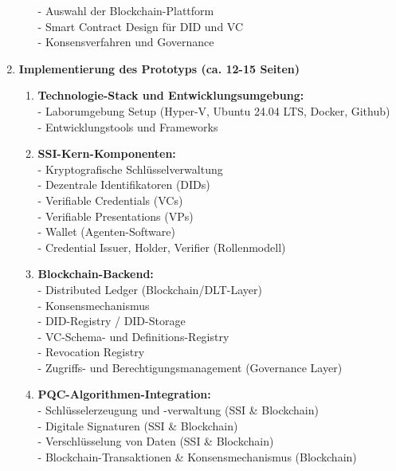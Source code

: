 \begin{enumerate}[label=\textbf{\arabic*.}]
\begin{enumerate}[label=\textbf{3.\arabic*}]
        - Auswahl der Blockchain-Plattform \\
        - Smart Contract Design für \ac{DID} und \ac{VC} \\
        - Konsensverfahren und Governance
    \end{enumerate}
    \item \textbf{Implementierung des Prototyps (ca. 12-15 Seiten)}
    \begin{enumerate}[label=\textbf{4.\arabic*}]
        \item \textbf{Technologie-Stack und Entwicklungsumgebung:} \\
        - Laborumgebung Setup (Hyper-V, Ubuntu 24.04 LTS, Docker, Github) \\
        - Entwicklungstools und Frameworks
        \item \textbf{SSI-Kern-Komponenten:} \\
        - Kryptografische Schlüsselverwaltung \\
        - Dezentrale Identifikatoren (\ac{DID}s) \\
        - Verifiable Credentials (\ac{VC}s) \\
        - Verifiable Presentations (\ac{VP}s) \\
        - Wallet (Agenten-Software) \\
        - Credential Issuer, Holder, Verifier (Rollenmodell)
        \pagebreak
        \item \textbf{Blockchain-Backend:} \\
        - Distributed Ledger (Blockchain/\ac{DLT}-Layer) \\
        - Konsensmechanismus \\
        - \ac{DID}-Registry / \ac{DID}-Storage \\
        - \ac{VC}-Schema- und Definitions-Registry \\
        - Revocation Registry \\
        - Zugriffs- und Berechtigungsmanagement (Governance Layer)
        \item \textbf{PQC-Algorithmen-Integration:} \\
        - Schlüsselerzeugung und -verwaltung (\ac{SSI} \& Blockchain) \\
        - Digitale Signaturen (\ac{SSI} \& Blockchain) \\
        - Verschlüsselung von Daten (SSI \& Blockchain) \\
        - Blockchain-Transaktionen \& Konsensmechanismus (Blockchain) \\

\end{enumerate}
\end{enumerate}
